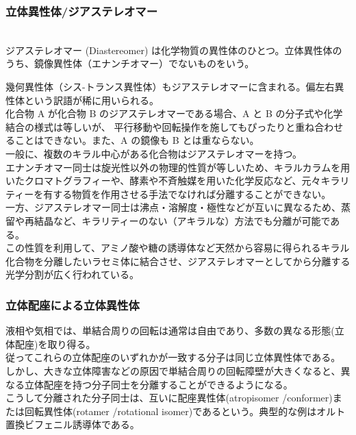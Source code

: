 \documentclass[dvipdfmx,uplatex,twocolumn,10pt]{jsarticle}
\begin{document}
\subsubsection{立体異性体/ジアステレオマー}
\begin{defi} \mbox{} \\
ジアステレオマー (Diastereomer) は化学物質の異性体のひとつ。立体異性体のうち、鏡像異性体（エナンチオマー）でないものをいう。 \\
\end{defi}
幾何異性体（シス-トランス異性体）もジアステレオマーに含まれる。偏左右異性体という訳語が稀に用いられる。 \\
化合物 A が化合物 B のジアステレオマーである場合、A と B の分子式や化学結合の様式は等しいが、
平行移動や回転操作を施してもぴったりと重ね合わせることはできない。また、A の鏡像も B とは重ならない。 \\
一般に、複数のキラル中心がある化合物はジアステレオマーを持つ。 \\
エナンチオマー同士は旋光性以外の物理的性質が等しいため、キラルカラムを用いたクロマトグラフィーや、酵素や不斉触媒を用いた化学反応など、元々キラリティーを有する物質を作用させる手法でなければ分離することができない。 \\
一方、ジアステレオマー同士は沸点・溶解度・極性などが互いに異なるため、蒸留や再結晶など、キラリティーのない（アキラルな）方法でも分離が可能である。 \\
この性質を利用して、アミノ酸や糖の誘導体など天然から容易に得られるキラル化合物を分離したいラセミ体に結合させ、ジアステレオマーとしてから分離する光学分割が広く行われている。 \\


\subsubsection{立体配座による立体異性体}

液相や気相では、単結合周りの回転は通常は自由であり、多数の異なる形態(立体配座)を取り得る。 \\
従ってこれらの立体配座のいずれかが一致する分子は同じ立体異性体である。 \\
しかし、大きな立体障害などの原因で単結合周りの回転障壁が大きくなると、異なる立体配座を持つ分子同士を分離することができるようになる。 \\
こうして分離された分子同士は、互いに配座異性体(atropisomer /conformer)または回転異性体(rotamer /rotational isomer)であるという。典型的な例はオルト置換ビフェニル誘導体である。 \\
\end{document}
